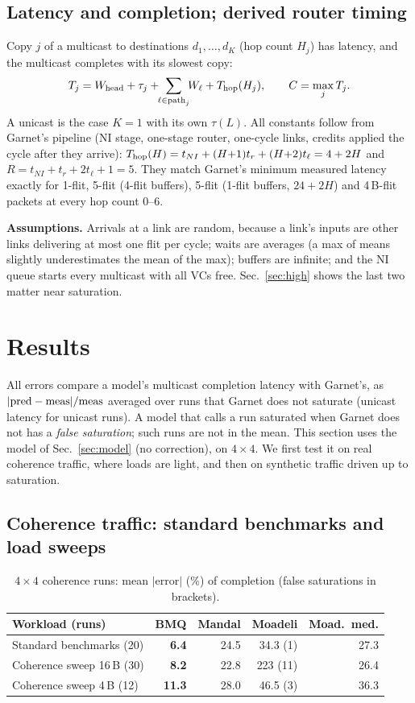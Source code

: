 \documentclass[conference]{IEEEtran}
\begin{document}
\subsection{Latency and completion; derived router timing}
\label{sec:timing}
Copy $j$ of a multicast to destinations $d_1,\dots,d_K$ (hop count $H_j$) has latency, and the multicast completes with its slowest copy:
\begin{equation}
T_j=W_{\rm head}+\tau_j+\!\!\sum_{\ell\in{\rm path}_j}\!\!W_\ell+T_{\rm hop}(H_j),\qquad C=\max_j T_j.
\label{eq:T}
\end{equation}
A unicast is the case $K{=}1$ with its own $\tau(L)$. All constants follow from Garnet's pipeline (NI stage, one-stage router, one-cycle links, credits applied the cycle after they arrive): $T_{\rm hop}(H)=t_{NI}+(H{+}1)t_{r}+(H{+}2)t_{\ell}=4+2H$ and $R=t_{NI}+t_r+2t_\ell+1=5$. They match Garnet's minimum measured latency exactly for 1-flit, 5-flit (4-flit buffers), 5-flit (1-flit buffers, $24{+}2H$) and 4\,B-flit packets at every hop count 0--6.

\textbf{Assumptions.} Arrivals at a link are random, because a link's inputs are other links delivering at most one flit per cycle; waits are averages (a max of means slightly underestimates the mean of the max); buffers are infinite; and the NI queue starts every multicast with all VCs free. Sec.~\ref{sec:high} shows the last two matter near saturation.

\section{Results}
All errors compare a model's multicast completion latency with Garnet's, as $|{\rm pred}-{\rm meas}|/{\rm meas}$ averaged over runs that Garnet does not saturate (unicast latency for unicast runs). A model that calls a run saturated when Garnet does not has a \emph{false saturation}; such runs are not in the mean. This section uses the model of Sec.~\ref{sec:model} (no correction), on $4{\times}4$. We first test it on real coherence traffic, where loads are light, and then on synthetic traffic driven up to saturation.

\subsection{Coherence traffic: standard benchmarks and load sweeps}
\begin{table}[t]
\centering\footnotesize
\caption{$4{\times}4$ coherence runs: mean $|$error$|$ (\%) of completion (false saturations in brackets).}
\label{tab:main}
\begin{tabular}{@{}lrrrr@{}}
\toprule
Workload (runs) & BMQ & Mandal & Moadeli & Moad.\ med.\\
\midrule
Standard benchmarks (20)    & \textbf{6.4} & 24.5 & 34.3 (1) & 27.3\\
Coherence sweep 16\,B (30)  & \textbf{8.2} & 22.8 & 223 (11) & 26.4\\
Coherence sweep 4\,B (12)   & \textbf{11.3} & 28.0 & 46.5 (3) & 36.3\\
\bottomrule
\end{tabular}
\end{table}
\end{document}
